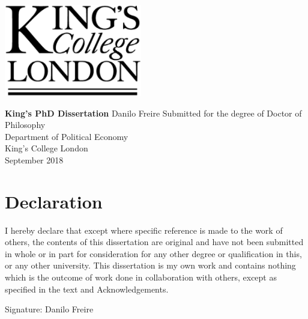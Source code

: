 \documentclass[a4paper,12pt]{report}
\begin{document}




\thispagestyle{empty}
\begin{center}
\includegraphics[width=6cm]{images/kcl.eps}
\end{center}	
\vskip40mm
\begin{center}
\huge\textbf{King's PhD Dissertation}
\vskip2mm
\vskip5mm
\Large Danilo Freire
\normalsize
\vfill
\large
Submitted for the degree of Doctor of Philosophy \\
Department of Political Economy \\
King's College London	\\
September 2018
\end{center}	


\chapter*{Declaration}
\noindent 
I hereby declare that except where specific reference is made to the work of others, the contents of this dissertation are original and have not been submitted in whole or in part for consideration for any other degree or qualification in this, or any other university. This dissertation is my own work and contains nothing which is the outcome of work done in collaboration with others, except as specified in the text and Acknowledgements. 


\vskip20mm
\noindent
Signature:
\vskip20mm
\noindent 
Danilo Freire


\end{document}
